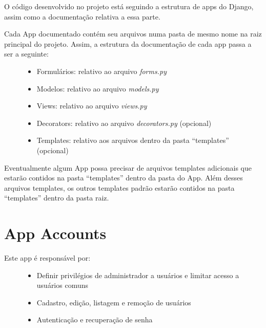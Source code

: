 \documentclass[letterpaper,10pt,brazil]{sphinxmanual}
\begin{document}
O código desenvolvido no projeto está seguindo a estrutura de apps do Django, assim como a documentação relativa a essa parte.
\begin{description}
\item[{Cada App documentado contém seu arquivos numa pasta de mesmo nome na raiz principal do projeto. Assim, a estrutura da documentação de cada app passa a ser a seguinte:}] \leavevmode\begin{itemize}
\item {} 
Formulários: relativo ao arquivo \emph{forms.py}

\item {} 
Modelos: relativo ao arquivo \emph{models.py}

\item {} 
Views: relativo ao arquivo \emph{views.py}

\item {} 
Decorators: relativo ao arquivo \emph{decorators.py} (opcional)

\item {} 
Templates: relativo aos arquivos dentro da pasta ``templates'' (opcional)

\end{itemize}

\end{description}

Eventualmente algum App possa precisar de arquivos templates adicionais que estarão contidos na pasta ``templates'' dentro da pasta do App. Além desses arquivos templates, os outros templates padrão estarão contidos na pasta ``templates'' dentro da pasta raiz.


\section{App Accounts}
\label{apps/accounts:accounts}\label{apps/accounts:app-accounts}\label{apps/accounts::doc}\begin{description}
\item[{Este app é responsável por:}] \leavevmode\begin{itemize}
\item {} 
Definir privilégios de administrador a usuários e limitar acesso a usuários comuns

\item {} 
Cadastro, edição, listagem e remoção de usuários

\item {} 
Autenticação e recuperação de senha

\end{itemize}

\end{description}
\end{document}
